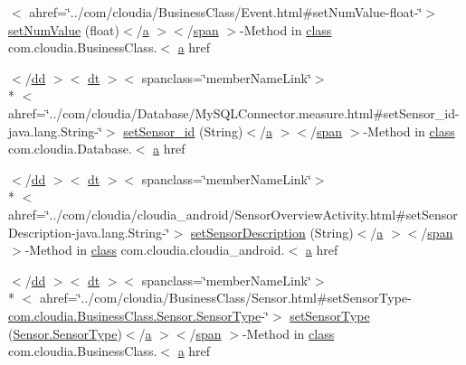 \begin{DoxyCompactItemize}
$<$ ahref=\char`\"{}../com/cloudia/Business\-Class/Event.\-html\#set\-Num\-Value-\/float-\/\char`\"{}$>$ \hyperlink{index-17_8html_aa942e06ee0ae339de3c2c593dfe2aae5}{set\-Num\-Value} (float)$<$/\hyperlink{style_8css_a5e8981582017bb8b84c21f148345d1f7}{a} $>$$<$/\hyperlink{stylesheet_8css_a8343996ebcf16220b04e54659aac31cc}{span} $>$-\/Method in \hyperlink{_tools_8html_acf06f836132665ba8114f5a414c2403f}{class} com.\-cloudia.\-Business\-Class.$<$ \hyperlink{style_8css_a5e8981582017bb8b84c21f148345d1f7}{a} href
\item 
$<$/\hyperlink{stylesheet_8css_a47f4718a86835a7771ec592ece845221}{dd} $>$$<$ \hyperlink{stylesheet_8css_a107565fb4039d33b041380d6e0ea1d80}{dt} $>$$<$ spanclass=\char`\"{}member\-Name\-Link\char`\"{}$>$\\*
$<$ ahref=\char`\"{}../com/cloudia/Database/My\-S\-Q\-L\-Connector.\-measure.\-html\#set\-Sensor\-\_\-id-\/java.\-lang.\-String-\/\char`\"{}$>$ \hyperlink{index-17_8html_afb94515a94c02ab6595ac997276c8e9d}{set\-Sensor\-\_\-id} (String)$<$/\hyperlink{style_8css_a5e8981582017bb8b84c21f148345d1f7}{a} $>$$<$/\hyperlink{stylesheet_8css_a8343996ebcf16220b04e54659aac31cc}{span} $>$-\/Method in \hyperlink{_tools_8html_acf06f836132665ba8114f5a414c2403f}{class} com.\-cloudia.\-Database.$<$ \hyperlink{style_8css_a5e8981582017bb8b84c21f148345d1f7}{a} href
\item 
$<$/\hyperlink{stylesheet_8css_a47f4718a86835a7771ec592ece845221}{dd} $>$$<$ \hyperlink{stylesheet_8css_a107565fb4039d33b041380d6e0ea1d80}{dt} $>$$<$ spanclass=\char`\"{}member\-Name\-Link\char`\"{}$>$\\*
$<$ ahref=\char`\"{}../com/cloudia/cloudia\-\_\-android/Sensor\-Overview\-Activity.\-html\#set\-Sensor\-Description-\/java.\-lang.\-String-\/\char`\"{}$>$ \hyperlink{index-17_8html_ac2cf024f46883e63c97476a371b53fa5}{set\-Sensor\-Description} (String)$<$/\hyperlink{style_8css_a5e8981582017bb8b84c21f148345d1f7}{a} $>$$<$/\hyperlink{stylesheet_8css_a8343996ebcf16220b04e54659aac31cc}{span} $>$-\/Method in \hyperlink{_tools_8html_acf06f836132665ba8114f5a414c2403f}{class} com.\-cloudia.\-cloudia\-\_\-android.$<$ \hyperlink{style_8css_a5e8981582017bb8b84c21f148345d1f7}{a} href
\item 
$<$/\hyperlink{stylesheet_8css_a47f4718a86835a7771ec592ece845221}{dd} $>$$<$ \hyperlink{stylesheet_8css_a107565fb4039d33b041380d6e0ea1d80}{dt} $>$$<$ spanclass=\char`\"{}member\-Name\-Link\char`\"{}$>$\\*
$<$ ahref=\char`\"{}../com/cloudia/Business\-Class/Sensor.\-html\#set\-Sensor\-Type-\/\hyperlink{index-17_8html_acc30d821f1b6d80e370a6043d5e05e29}{com.\-cloudia.\-Business\-Class.\-Sensor.\-Sensor\-Type}-\/\char`\"{}$>$ \hyperlink{index-17_8html_a09b40a4f2285d5ff87b74a3adbcaddc1}{set\-Sensor\-Type} (\hyperlink{index-17_8html_acc30d821f1b6d80e370a6043d5e05e29}{Sensor.\-Sensor\-Type})$<$/\hyperlink{style_8css_a5e8981582017bb8b84c21f148345d1f7}{a} $>$$<$/\hyperlink{stylesheet_8css_a8343996ebcf16220b04e54659aac31cc}{span} $>$-\/Method in \hyperlink{_tools_8html_acf06f836132665ba8114f5a414c2403f}{class} com.\-cloudia.\-Business\-Class.$<$ \hyperlink{style_8css_a5e8981582017bb8b84c21f148345d1f7}{a} href

\end{DoxyCompactItemize}

